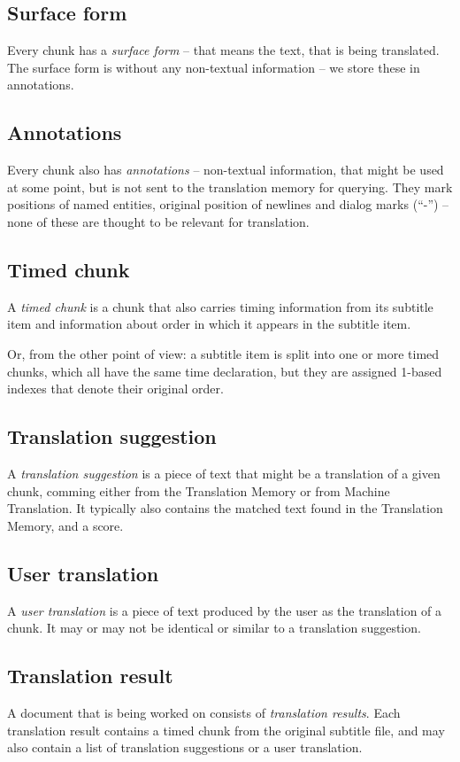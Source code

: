 \subsection*{Surface form}
Every chunk has a \emph{surface form} -- that means the text, that is being translated. The surface form is without any non-textual information -- we store these in annotations.

\subsection*{Annotations}
Every chunk also has \emph{annotations} -- non-textual information, that might be used at some point, but is not sent to the translation memory for querying. They mark positions of named entities, original position of newlines and dialog marks (``-'') -- none of these are thought to be relevant for translation.

\subsection*{Timed chunk}
A \emph{timed chunk} is a chunk that also carries timing information from its subtitle item and information about order in which it appears in the subtitle item.

Or, from the other point of view: a subtitle item is split into one or more timed chunks, which all have the same time declaration, but they are assigned 1-based indexes that denote their original order.

\subsection*{Translation suggestion}
A \emph{translation suggestion} is a piece of text that might be a translation of a given chunk, comming either from the Translation Memory or from Machine Translation. It typically also contains the matched text found in the Translation Memory, and a score.

\subsection*{User translation}
A \emph{user translation} is a piece of text produced by the user as the translation of a chunk. It may or may not be identical or similar to a translation suggestion.

\subsection*{Translation result}
A document that is being worked on consists of \emph{translation results}. Each translation result contains a timed chunk from the original subtitle file, and may also contain a list of translation suggestions or a user translation.

